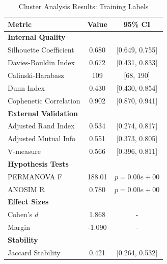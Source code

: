 
\begin{table}[h!]
\centering
\caption{Cluster Analysis Results: Training Labels}
\label{tab:cluster_training}
\begin{tabular}{lcc}
\toprule
Metric & Value & 95\% CI \\
\midrule
\multicolumn{3}{l}{\textbf{Internal Quality}} \\
Silhouette Coefficient & 0.680 & [0.649, 0.755] \\
Davies-Bouldin Index & 0.672 & [0.431, 0.833] \\
Calinski-Harabasz & 109 & [68, 190] \\
Dunn Index & 0.430 & [0.430, 0.854] \\
Cophenetic Correlation & 0.902 & [0.870, 0.941] \\
\midrule
\multicolumn{3}{l}{\textbf{External Validation}} \\
Adjusted Rand Index & 0.534 & [0.274, 0.817] \\
Adjusted Mutual Info & 0.551 & [0.373, 0.805] \\
V-measure & 0.566 & [0.396, 0.811] \\
\midrule
\multicolumn{3}{l}{\textbf{Hypothesis Tests}} \\
PERMANOVA F & 188.01 & $p = 0.00e+00$ \\
ANOSIM R & 0.780 & $p = 0.00e+00$ \\
\midrule
\multicolumn{3}{l}{\textbf{Effect Sizes}} \\
Cohen's $d$ & 1.868 & - \\
Margin & -1.090 & - \\
\midrule
\multicolumn{3}{l}{\textbf{Stability}} \\
Jaccard Stability & 0.421 & [0.264, 0.532] \\
\bottomrule
\end{tabular}
\end{table}
